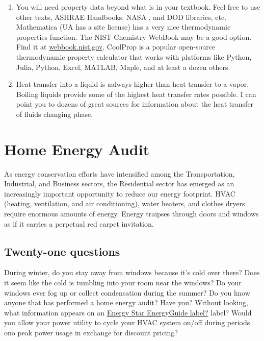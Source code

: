 \documentclass[
]{book}
\begin{document}
\begin{enumerate}
\def\labelenumi{\arabic{enumi}.}
\item
  You will need property data beyond what is in your textbook. Feel free to use other texts, ASHRAE Handbooks, NASA \citep{mcbride_nasa_2002}, \citep{noauthor_nasa_nodate} and DOD \citep{noauthor_defense_nodate} libraries, etc. Mathematica (UA has a site license) has a very nice thermodynamic properties function. The NIST \citep{linstrom_nist_2019} Chemistry WebBook may be a good option. Find it at \url{webbook.nist.gov}. CoolProp \citep{bell_pure_2014} is a popular open-source thermodynamic property calculator that works with platforms like Python, Julia, Python, Excel, MATLAB, Maple, and at least a dozen others.
\item
  Heat transfer into a liquid is aalways higher than heat transfer to a vapor. Boiling liquids provide some of the highest heat transfer rates possible. I can point you to dozens of great sources for information about the heat transfer of fluids changing phase.
\end{enumerate}

\hypertarget{home-energy-audit}{%
\chapter{Home Energy Audit}\label{home-energy-audit}}

As energy conservation efforts have intensified among the Transportation, Industrial, and Business sectors, the Residential sector has emerged as an increasingly important opportunity to reduce our energy footprint. HVAC (heating, ventilation, and air conditioning), water heaters, and clothes dryers require enormous amounts of energy. Energy traipses through doors and windows as if it carries a perpetual red carpet invitation.

\hypertarget{twenty-one-questions}{%
\section{Twenty-one questions}\label{twenty-one-questions}}

During winter, do you stay away from windows because it's cold over there? Does it seem like the cold is tumbling into your room near the windows? Do your windows ever fog up or collect condensation during the summer? Do you know anyone that has performed a home energy audit? Have you? Without looking, what information appears on an \href{https://www.snopud.com/site/content/images/ee/eguidelabel.jpg}{Energy Star EnergyGuide label?} label? Would you allow your power utility to cycle your HVAC system on/off during periods ono peak power usage in exchange for discount pricing?
\end{document}
